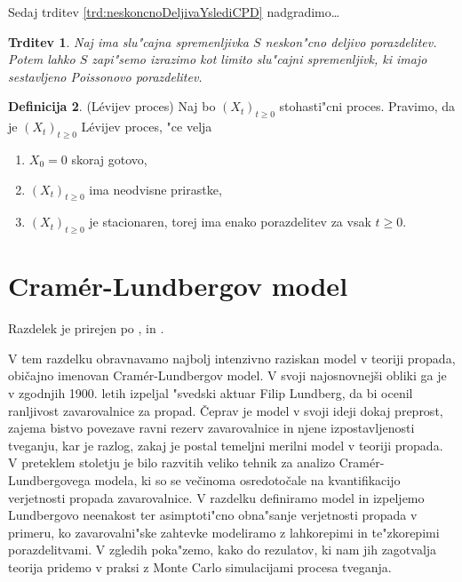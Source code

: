 \documentclass[12pt, a4paper, reqno]{amsart}
\theoremstyle{definition}
\newtheorem{definicija}{Definicija}[section]
\theoremstyle{plain}
\newtheorem{trditev}[definicija]{Trditev}
\newcommand{\1}{\mathds{1}}
\begin{document}
    Sedaj trditev \ref{trd:neskoncnoDeljivaYslediCPD} nadgradimo\dots

    \begin{trditev}
        Naj ima slu"cajna spremenljivka $S$ neskon"cno deljivo porazdelitev. Potem lahko $S$ zapi"semo
        izrazimo kot limito slu"cajni spremenljivk, ki imajo sestavljeno Poissonovo porazdelitev.
    \end{trditev}

    \begin{definicija}
        (Lévijev proces) Naj bo $(X_t)_{t\geq0}$ stohasti"cni proces. Pravimo, da je $(X_t)_{t\geq0}$
        Lévijev proces, "ce velja
        \begin{enumerate}
            \item $X_0 = 0$ skoraj gotovo,
            \item $(X_t)_{t\geq0}$ ima neodvisne prirastke,
            \item $(X_t)_{t\geq0}$ je stacionaren, torej ima enako porazdelitev za vsak $t\geq0$.
        \end{enumerate}

    \end{definicija}
\pagebreak

\section{Cramér-Lundbergov model}
    \noindent
    Razdelek je prirejen po \cite{3}, \cite{4} in  \cite{5}.

    V tem razdelku obravnavamo najbolj intenzivno raziskan model v teoriji propada, običajno imenovan 
    Cramér-Lundbergov model. V svoji najosnovnejši obliki 
    ga je v zgodnjih 1900. letih izpeljal "svedski aktuar Filip Lundberg, da bi ocenil ranljivost 
    zavarovalnice za propad. Čeprav je model v svoji ideji dokaj preprost, 
     zajema bistvo povezave ravni rezerv zavarovalnice in njene izpostavljenosti tveganju, 
    kar je razlog, zakaj je postal temeljni merilni model v teoriji propada.
    V preteklem stoletju je bilo razvitih veliko tehnik za analizo Cramér-Lundbergovega modela, 
    ki so se večinoma osredotočale na kvantifikacijo verjetnosti propada zavarovalnice. V razdelku definiramo 
    model in izpeljemo Lundbergovo neenakost ter asimptoti"cno obna"sanje verjetnosti propada v primeru, ko 
    zavarovalni"ske zahtevke modeliramo z lahkorepimi in te"zkorepimi porazdelitvami. V zgledih 
    poka"zemo, kako do rezulatov, ki nam jih zagotvalja teorija pridemo v praksi z Monte Carlo 
    simulacijami procesa tveganja.
\end{document}
